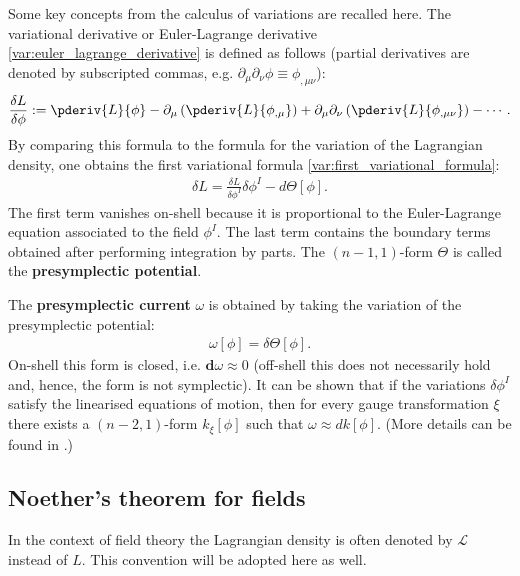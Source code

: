     Some key concepts from the calculus of variations are recalled here. The variational derivative or Euler-Lagrange derivative \eqref{var:euler_lagrange_derivative} is defined as follows (partial derivatives are denoted by subscripted commas, e.g. $\partial_\mu\partial_\nu\phi\equiv\phi_{,\mu\nu}$):
    \begin{gather}
        \frac{\delta L}{\delta \phi} := \pderiv{L}{\phi} - \partial_\mu\left(\pderiv{L}{\phi_{,\mu}}\right) + \partial_\mu\partial_\nu\left(\pderiv{L}{\phi_{,\mu\nu}}\right) -\cdots.
    \end{gather}
    By comparing this formula to the formula for the variation of the Lagrangian density, one obtains the first variational formula \eqref{var:first_variational_formula}:
    \begin{gather}
        \delta L = \frac{\delta L}{\delta \phi^I}\delta\phi^I - d\Theta[\phi].
    \end{gather}
    The first term vanishes on-shell because it is proportional to the Euler-Lagrange equation associated to the field $\phi^I$. The last term contains the boundary terms obtained after performing integration by parts. The $(n-1,1)$-form $\Theta$ is called the \textbf{presymplectic potential}.

    The \textbf{presymplectic current} $\omega$ is obtained by taking the variation of the presymplectic potential:
    \begin{gather}
        \omega[\phi] = \delta\Theta[\phi].
    \end{gather}
    On-shell this form is closed, i.e. $\mathbf{d}\omega\approx0$ (off-shell this does not necessarily hold and, hence, the form is not symplectic). It can be shown that if the variations $\delta\phi^I$ satisfy the linearised equations of motion, then for every gauge transformation $\xi$ there exists a $(n-2,1)$-form $k_\xi[\phi]$ such that $\omega\approx dk[\phi]$. (More details can be found in \cite{compere}.)

\subsection{Noether's theorem for fields}

    In the context of field theory the Lagrangian density is often denoted by $\mathcal{L}$ instead of $L$. This convention will be adopted here as well.

